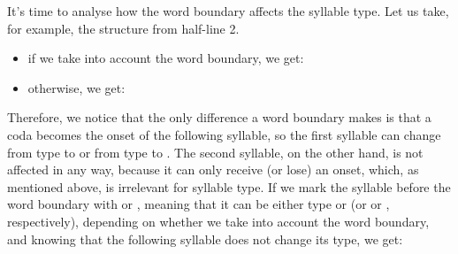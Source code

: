 \begin{refsection}
\begin{mysolution}
It's time to analyse how the word boundary affects the syllable type. Let us take, for example, the structure  from half-line 2.

\begin{itemize}
\item 	if we take into account the word boundary, we get: 
\item 	otherwise, we get: 
\end{itemize}

Therefore, we notice that the only difference a word boundary makes is that a coda becomes the onset of the following syllable, so the first syllable can change from type  to  or from type  to . The second syllable, on the other hand, is not affected in any way, because it can only receive (or lose) an onset, which, as mentioned above, is irrelevant for syllable type. If we mark the syllable before the word boundary with  or , meaning that it can be either type  or  (or  or , respectively), depending on whether we take into account the word boundary, and knowing that the following syllable does not change its type, we get:


\end{mysolution}
\end{refsection}

